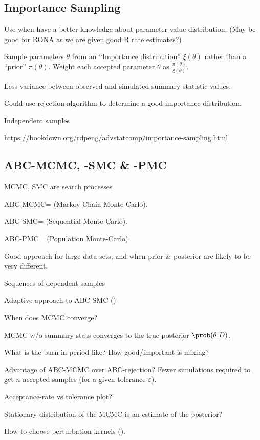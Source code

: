 \documentclass[11pt,a4paper,margin=0]{article}
\begin{document}
\subsection{Importance Sampling}\label{sec_ABC_IS}

  \par Use when have a better knowledge about parameter value distribution. (May be good for RONA as we are given good R rate estimates?)
  \par Sample parameters $\theta$ from an ``Importance distribution'' $\xi(\theta)$ rather than a ``prior'' $\pi(\theta)$. Weight each accepted parameter $\theta$ as $\frac{\pi(\theta)}{\xi(\theta)}$.
  \par Less variance between observed and simulated summary statistic values.
  \par Could use rejection algorithm to determine a good importance distribution.
  \par Independent samples
  \par \url{https://bookdown.org/rdpeng/advstatcomp/importance-sampling.html}

\subsection*{ABC-MCMC, -SMC \& -PMC}\label{sec_ABC_MCMC}

  \par MCMC, SMC are search processes
  \par ABC-MCMC=\cite{mcmc_wo_likelihood} (Markov Chain Monte Carlo).
  \par ABC-SMC=\cite{SMC_wo_likelihood} (Sequential Monte Carlo).
  \par ABC-PMC=\cite{adaptive_ABC} (Population Monte-Carlo).
  \par Good approach for large data sets, and when prior \& posterior are likely to be very different.
  \par Sequences of dependent samples
  \par Adaptive approach to ABC-SMC (\cite{adaptive_SMC_method_for_ABC})
  \par When does MCMC converge?
  \par MCMC w/o summary stats converges to the true posterior $\prob(\theta|D)$.
  \par What is the burn-in period like? How good/important is mixing?
  \par Advantage of ABC-MCMC over ABC-rejection? Fewer simulations required to get $n$ accepted samples (for a given tolerance $\varepsilon$).
  \par Acceptance-rate vs tolerance plot?
  \par Stationary distribution of the MCMC is an estimate of the posterior?
  \par How to choose perturbation kernels (\cite{on_optimality_of_kernels_for_approximate_bayesian_computation_using_SMC}).
\end{document}
